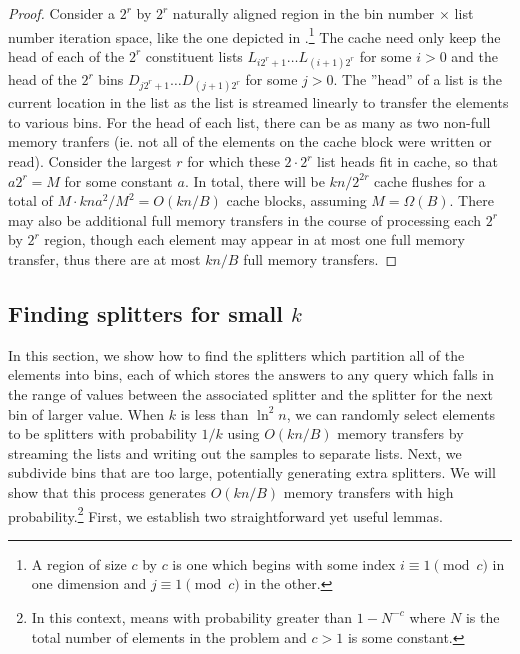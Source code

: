 \begin{proof}
Consider a $2^r$ by $2^r$ naturally aligned region in the bin number $\times$ list
number iteration space, like the one depicted in 
.\footnote{A  region
of size $c$ by $c$ is one which begins with some index $i \equiv 1 \pmod{c}$ 
in one dimension and $j \equiv 1 \pmod{c}$ in the other.}  
The cache need only keep the head of each of the $2^r$ constituent
lists $L_{i2^r + 1} \ldots L_{(i+1)2^r}$ for some $i>0$ and the head of the $2^r$ bins 
$D_{j2^r + 1} \ldots D_{(j+1)2^r}$ for some $j>0$. 
The ''head'' of a list is the current location
in the list as the list is streamed linearly to transfer the elements to various bins.  
For the head of each list, there can be as many as
two non-full memory tranfers (ie. not all of the elements on the cache block were
written or read).  Consider the largest $r$ for which these $2 \cdot 2^r$ list heads
fit in cache, so that $a2^r = M$ for some constant $a$.  In total, there will be 
$kn/2^{2r}$ cache flushes for a total of $M \cdot kna^2/M^2 = O(kn/B)$ cache blocks, 
assuming $M = \Omega(B)$.  There may also be additional full memory transfers in the
course of processing each $2^r$ by $2^r$ region, though
each element may appear in at most one full memory transfer, thus there are at most
$kn/B$ full memory transfers.  
\end{proof}

\subsection*{Finding splitters for small $k$}

In this section, we show how to find the splitters
which partition all of the elements into bins, each of which stores the answers to any
query which falls in the range of values between the associated splitter and the
splitter for the next bin of larger value.
When $k$ is less than $\ln^2 n$, we can randomly select elements to be splitters
with probability $1/k$ using $O(kn/B)$ memory transfers by streaming the lists and
writing out the samples to separate lists.  Next, 
we subdivide bins that are too large, potentially generating
extra splitters.  We will show that this process generates $O(kn/B)$ memory 
transfers with high probability.\footnote{In this context, 
 means with probability greater
than $1-N^{-c}$ where $N$ is the total number of elements in the problem and $c > 1$
is some constant.} First, we establish two straightforward yet useful lemmas.

